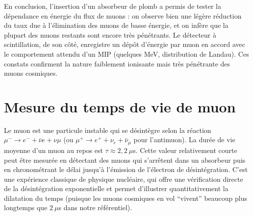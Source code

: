 \documentclass[a4paper,12pt,twoside]{article}
\begin{document}
En conclusion, l’insertion d’un absorbeur de plomb a permis de tester la dépendance en énergie du flux de muons : on observe bien une légère réduction du taux due à l’élimination des muons de basse énergie, et on infère que la plupart des muons restants sont encore très pénétrants. Le détecteur à scintillation, de son côté, enregistre un dépôt d’énergie par muon en accord avec le comportement attendu d’un MIP (quelques MeV, distribution de Landau). Ces constats confirment la nature faiblement ionisante mais très pénétrante des muons cosmiques.

\section{Mesure du temps de vie de muon}
Le muon est une particule instable qui se désintègre selon la réaction $\mu^- \to e^- + \bar{\nu}e + \nu\mu$ (ou $\mu^+ \to e^+ + \nu_e + \bar{\nu}_\mu$ pour l’antimuon). La durée de vie moyenne d’un muon au repos est $\tau \approx 2,2~\mu$s. Cette valeur relativement courte peut être mesurée en détectant des muons qui s’arrêtent dans un absorbeur puis en chronométrant le délai jusqu’à l’émission de l’électron de désintégration. C’est une expérience classique de physique nucléaire, qui offre une vérification directe de la désintégration exponentielle et permet d’illustrer quantitativement la dilatation du temps (puisque les muons cosmiques en vol “vivent” beaucoup plus longtemps que $2~\mu$s dans notre référentiel).
\end{document}
